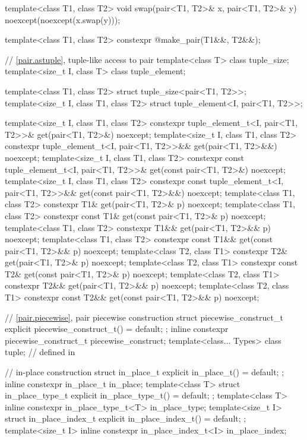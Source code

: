 \begin{codeblock}
{  template<class T1, class T2>
    void swap(pair<T1, T2>& x, pair<T1, T2>& y) noexcept(noexcept(x.swap(y)));

  template<class T1, class T2>
    constexpr @\seebelow@ make_pair(T1&&, T2&&);

  // \ref{pair.astuple}, tuple-like access to pair
  template<class T> class tuple_size;
  template<size_t I, class T> class tuple_element;

  template<class T1, class T2> struct tuple_size<pair<T1, T2>>;
  template<size_t I, class T1, class T2> struct tuple_element<I, pair<T1, T2>>;

  template<size_t I, class T1, class T2>
    constexpr tuple_element_t<I, pair<T1, T2>>& get(pair<T1, T2>&) noexcept;
  template<size_t I, class T1, class T2>
    constexpr tuple_element_t<I, pair<T1, T2>>&& get(pair<T1, T2>&&) noexcept;
  template<size_t I, class T1, class T2>
    constexpr const tuple_element_t<I, pair<T1, T2>>& get(const pair<T1, T2>&) noexcept;
  template<size_t I, class T1, class T2>
    constexpr const tuple_element_t<I, pair<T1, T2>>&& get(const pair<T1, T2>&&) noexcept;
  template<class T1, class T2>
    constexpr T1& get(pair<T1, T2>& p) noexcept;
  template<class T1, class T2>
    constexpr const T1& get(const pair<T1, T2>& p) noexcept;
  template<class T1, class T2>
    constexpr T1&& get(pair<T1, T2>&& p) noexcept;
  template<class T1, class T2>
    constexpr const T1&& get(const pair<T1, T2>&& p) noexcept;
  template<class T2, class T1>
    constexpr T2& get(pair<T1, T2>& p) noexcept;
  template<class T2, class T1>
    constexpr const T2& get(const pair<T1, T2>& p) noexcept;
  template<class T2, class T1>
    constexpr T2&& get(pair<T1, T2>&& p) noexcept;
  template<class T2, class T1>
    constexpr const T2&& get(const pair<T1, T2>&& p) noexcept;

  // \ref{pair.piecewise}, pair piecewise construction
  struct piecewise_construct_t {
    explicit piecewise_construct_t() = default;
  };
  inline constexpr piecewise_construct_t piecewise_construct{};
  template<class... Types> class tuple;        // defined in 

  // in-place construction
  struct in_place_t {
    explicit in_place_t() = default;
  };
  inline constexpr in_place_t in_place{};
  template<class T>
    struct in_place_type_t {
      explicit in_place_type_t() = default;
    };
  template<class T> inline constexpr in_place_type_t<T> in_place_type{};
  template<size_t I>
    struct in_place_index_t {
      explicit in_place_index_t() = default;
    };
  template<size_t I> inline constexpr in_place_index_t<I> in_place_index{};
}
\end{codeblock}

